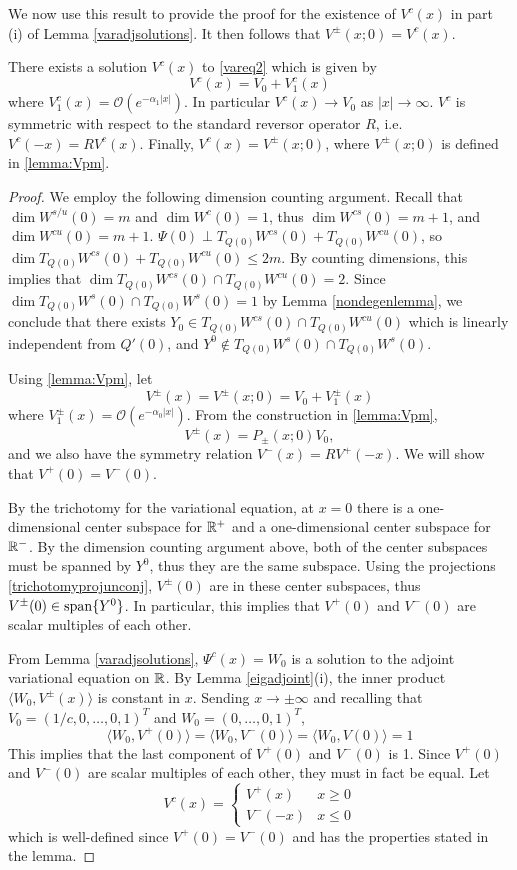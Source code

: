 \documentclass[thesis.tex]{subfiles}
\begin{document}
We now use this result to provide the proof for the existence of $V^c(x)$ in part (i) of Lemma \ref{varadjsolutions}. It then follows that $V^\pm(x; 0) = V^c(x)$.

\begin{lemma}\label{lemma:Vcexists}
There exists a solution $V^c(x)$ to \eqref{vareq2} which is given by
\[
V^c(x) = V_0 + V^c_1(x)
\]
where $V^c_1(x) = \mathcal{O}(e^{-\alpha_1 |x|})$. In particular $V^c(x) \rightarrow V_0$ as $|x| \rightarrow \infty$. $V^c$ is symmetric with respect to the standard reversor operator $R$, i.e. $V^c(-x) = R V^c(x)$. Finally, $V^c(x) = V^\pm(x; 0)$, where $V^\pm(x; 0)$ is defined in \cref{lemma:Vpm}. 

\begin{proof}
We employ the following dimension counting argument. Recall that $\dim W^{s/u}(0) = m$ and $\dim W^c(0) = 1$, thus $\dim W^{cs}(0) = m + 1$, and $\dim W^{cu}(0) = m + 1$. $\Psi(0) \perp T_{Q(0)}W^{cs}(0) + T_{Q(0)}W^{cu}(0)$, so $\dim T_{Q(0)}W^{cs}(0) + T_{Q(0)}W^{cu}(0) \leq 2m$. By counting dimensions, this implies that $\dim T_{Q(0)}W^{cs}(0) \cap T_{Q(0)}W^{cu}(0) = 2$. Since $\dim T_{Q(0)}W^s(0) \cap T_{Q(0)}W^s(0) = 1$ by Lemma \ref{nondegenlemma}, we conclude that there exists $Y_0 \in T_{Q(0)}W^{cs}(0) \cap T_{Q(0)}W^{cu}(0)$ which is linearly independent from $Q'(0)$, and $Y^0 \notin T_{Q(0)}W^s(0) \cap T_{Q(0)}W^s(0)$.

Using \cref{lemma:Vpm}, let
\[
V^\pm(x) = V^\pm(x; 0) = V_0 + V_1^\pm(x)
\]
where $V_1^\pm(x) = \mathcal{O}(e^{-\alpha_0 |x|})$. From the construction in \cref{lemma:Vpm},
\[
V^\pm(x) = P_\pm(x; 0) V_0,
\]
and we also have the symmetry relation $V^-(x) = R V^+(-x)$. We will show that $V^+(0) = V^-(0)$.

By the trichotomy for the variational equation, at $x = 0$ there is a one-dimensional center subspace for $\mathbb{R}^+$ and a one-dimensional center subspace for $\mathbb{R}^-$. By the dimension counting argument above, both of the center subspaces must be spanned by $Y^0$, thus they are the same subspace. Using the projections \eqref{trichotomyprojunconj}, $V^\pm(0)$ are in these center subspaces, thus $V^\pm(0) \in \mathop\mathrm{span}\nolimits \{Y^0 \}$. In particular, this implies that $V^+(0)$ and $V^-(0)$ are scalar multiples of each other. 

From Lemma \ref{varadjsolutions}, $\Psi^c(x) = W_0$ is a solution to the adjoint variational equation on $\mathbb{R}$. By Lemma \ref{eigadjoint}(i), the inner product $\langle W_0, V^\pm(x) \rangle$ is constant in $x$. Sending $x \rightarrow \pm \infty$ and recalling that $V_0 = (1/c, 0, \dots, 0, 1)^T $ and $W_0 = (0, \dots, 0, 1)^T$,
\[
\langle W_0, V^+(0) \rangle = \langle W_0, V^-(0) \rangle
= \langle W_0, V(0) \rangle = 1
\]
This implies that the last component of $V^+(0)$ and $V^-(0)$ is 1. Since $V^+(0)$ and $V^-(0)$ are scalar multiples of each other, they must in fact be equal. Let
\[
V^c(x) = \begin{cases}
V^+(x) & x \geq 0 \\
V^-(-x) & x \leq 0 
\end{cases}
\]
which is well-defined since $V^+(0) = V^-(0)$ and has the properties stated in the lemma.
\end{proof}
\end{lemma}
\end{document}
